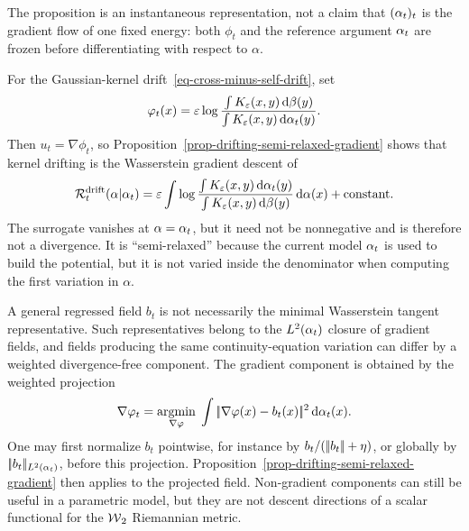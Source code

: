 The proposition is an instantaneous representation, not a claim that $(\alpha_t)_t$ is the gradient flow of one fixed energy: both $\phi_t$ and the reference argument $\alpha_t$ are frozen before differentiating with respect to $\alpha$.

\begin{example}
	For the Gaussian-kernel drift~\eqref{eq-cross-minus-self-drift}, set
	\[
		\varphi_t(x)=
		\varepsilon\log
		\frac{\int K_\varepsilon(x,y)\,\mathrm{d}\beta(y)}
		     {\int K_\varepsilon(x,y)\,\mathrm{d}\alpha_t(y)}.
	\]
	Then $u_t=\nabla\phi_t$, so Proposition~\ref{prop-drifting-semi-relaxed-gradient} shows that kernel drifting is the Wasserstein gradient descent of
	\[
		\mathcal R_t^{\mathrm{drift}}(\alpha|\alpha_t)
		=
		\varepsilon
		\int
		\log
		\frac{\int K_\varepsilon(x,y)\,\mathrm{d}\alpha_t(y)}
		     {\int K_\varepsilon(x,y)\,\mathrm{d}\beta(y)}
		\,\mathrm{d}\alpha(x)
		+\mathrm{constant}.
	\]
	The surrogate vanishes at $\alpha=\alpha_t$, but it need not be nonnegative and is therefore not a divergence. It is ``semi-relaxed'' because the current model $\alpha_t$ is used to build the potential, but it is not varied inside the denominator when computing the first variation in $\alpha$.
\end{example}

\begin{rem}
	A general regressed field $b_t$ is not necessarily the minimal Wasserstein tangent representative. Such representatives belong to the $L^2(\alpha_t)$ closure of gradient fields, and fields producing the same continuity-equation variation can differ by a weighted divergence-free component. The gradient component is obtained by the weighted projection
	\[
		\nabla\varphi_t
		=
		\underset{\nabla\varphi}{\operatorname{argmin}}\;
		\int |\!| \nabla\varphi(x)-b_t(x) |\!|^2\,\mathrm{d}\alpha_t(x).
	\]
	One may first normalize $b_t$ pointwise, for instance by $b_t/(|\!| b_t |\!|+\eta)$, or globally by $|\!| b_t |\!|_{L^2(\alpha_t)}$, before this projection. Proposition~\ref{prop-drifting-semi-relaxed-gradient} then applies to the projected field. Non-gradient components can still be useful in a parametric model, but they are not descent directions of a scalar functional for the $\operatorname{\mathcal{W}}_2$ Riemannian metric.
\end{rem}

